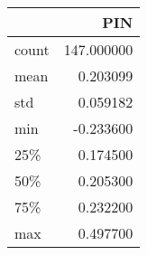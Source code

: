 \begin{tabular}{lr}
\toprule
{} &         PIN \\
\midrule
count &  147.000000 \\
mean  &    0.203099 \\
std   &    0.059182 \\
min   &   -0.233600 \\
25\%   &    0.174500 \\
50\%   &    0.205300 \\
75\%   &    0.232200 \\
max   &    0.497700 \\
\bottomrule
\end{tabular}
